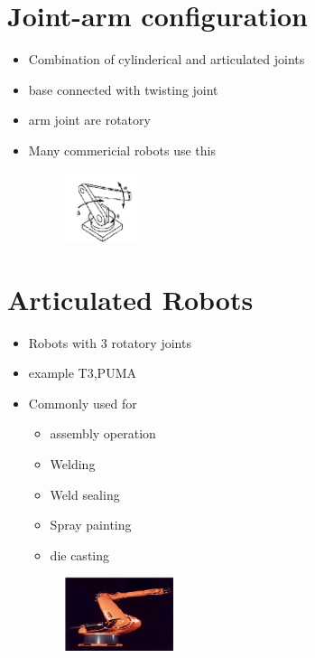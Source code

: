 \documentclass{article}
\begin{document}
\section{Joint-arm configuration}
\begin{itemize}
	\item Combination of cylinderical and articulated joints
	\item base connected with twisting joint
	\item arm joint are rotatory
	\item Many commericial robots use this
	      \begin{figure}[htpb]
		      \centering
		      \includegraphics[width=0.2\textwidth]{jointarmConfig.png}
		      \caption{}
		      \label{fig:}
	      \end{figure}
\end{itemize}
\section{Articulated Robots}
\begin{itemize}
	\item Robots with 3 rotatory joints
	\item example T3,PUMA
	\item Commonly used for
	      \begin{itemize}
		      \item assembly operation
		      \item Welding
		      \item Weld sealing
		      \item Spray painting
		      \item die casting
	      \end{itemize}
	      \begin{figure}[htpb]
		      \centering
		      \includegraphics[width=0.3\textwidth]{articulatedRobots.png}
		      \caption{}
		      \label{fig:}
	      \end{figure}
\end{itemize}
\end{document}
